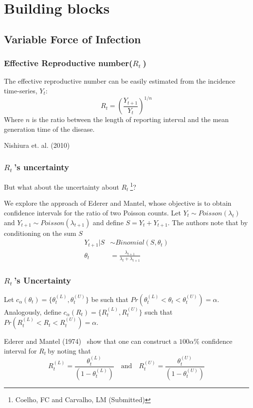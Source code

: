 \documentclass[10pt,compress,notheorems]{beamer}
\def \rr {$R_{t}\:$}
\begin{document}
\section{Building blocks}

\subsection{Variable Force of Infection}
\begin{frame}
\frametitle{Effective Reproductive number(\rr)}
The effective reproductive number can be easily estimated from the incidence 
time-series, $Y_t$:
\begin{equation}
\label{eq:Rtestimate}
R_t = \left( \frac{Y_{t+1}}{Y_t}\right)^{1/n}
\end{equation}
Where $n$ is the ratio between the length of reporting interval and 
the mean generation time of the disease.
\begin{flushright}
 Nishiura et. al. (2010)
\end{flushright}
\end{frame}

\begin{frame}
\frametitle{\rr's uncertainty}
But what about the uncertainty about \rr\footnote{Coelho, FC and Carvalho, LM 
(Submitted)}?

We explore the approach of Ederer and Mantel\cite{mantel}, whose objective is 
to obtain 
confidence intervals for the ratio of two Poisson counts. 
Let $Y_{t} \sim Poisson(\lambda_t)$ and $Y_{t+1} \sim Poisson(\lambda_{t+1})$ 
and define $S = Y_{t} + Y_{t+1}$.
The authors note that by conditioning on the sum $S$
\begin{align}
\label{eq:binlike}
Y_{t+1} | S &\sim Binomial(S, \theta_t) \\
\theta_t &= \frac{\lambda_{t+1}}{\lambda_{t} + \lambda_{t+1}}
\end{align}
\end{frame}

\begin{frame}
\frametitle{\rr's Uncertainty}
Let $c_{\alpha}(\theta_t) = \{\theta_t^{(L)} , \theta_t^{(U)} \}$ be such that 
$Pr(\theta_t^{(L)}<\theta_t <\theta_t^{(U)}) = \alpha$.
Analogously, define $c_{\alpha}(R_t) = \{R_t^{(L)} , R_t^{(U)} \}$ such that 
$Pr(R_t^{(L)}<R_t<R_t^{(U)}) = \alpha$.

Ederer and Mantel (1974)~\cite{mantel} show that one can construct a $100\alpha 
\%$ confidence interval for \rr by noting that
\begin{equation}
\label{eq:confRt}
 R_t^{(L)} = \frac{\theta_t^{(L)}}{(1-\theta_t^{(L)})} \quad \text{and} \quad 
R_t^{(U)} = \frac{\theta_t^{(U)}}{(1-\theta_t^{(U)})}
\end{equation}
\end{frame}
\end{document}
